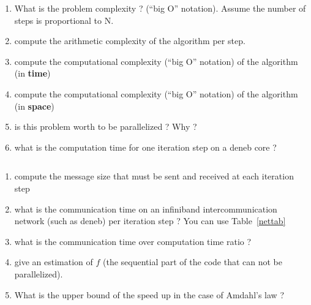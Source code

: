 \documentclass[11pt,a4paper]{article}
\begin{document}

\begin{exercise}
  $~$ %
\begin{enumerate}[label=(\alph*)]

	\item What is the problem complexity ? (``big O'' notation). Assume the number of steps is proportional to N. 




	\item compute the arithmetic complexity of the algorithm per step. 



	\item compute the computational complexity (``big O'' notation) of the algorithm (in {\bf time})



	\item compute the computational complexity (``big O'' notation) of the algorithm (in {\bf space})



	\item is this problem worth to be parallelized ? Why ?



	\item what is the computation time for one iteration step on a deneb core ?



\end{enumerate}

\end{exercise}


\begin{exercise}

  $~$ %

\begin{enumerate}[label=(\alph*)]
	\item compute the message size that must be sent and received at each iteration step

	\item what is the communication time on an infiniband intercommunication network (such as deneb) per iteration step ? You can use Table~\ref{nettab}

	\item what is the communication time over computation time ratio ?

	\item give an estimation of $f$ (the sequential part of the code that can not be parallelized). 

	\item What is the upper bound of the speed up in the case of Amdahl's law ? 

\end{enumerate}
  

\end{exercise}
\end{document}
